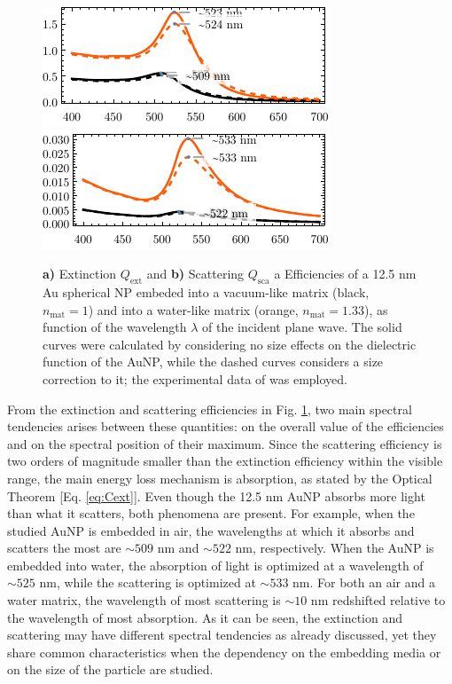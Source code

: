  \begin{figure}[h!]
 \includegraphics[scale=1.4]{1-Theory-Figs/Mie-Au/extinction-12--5nm-Au-in-H2O.pdf}
 \includegraphics[scale=1.4]{1-Theory-Figs/Mie-Au/scattering-12--5nm-Au-in-H2O.pdf}
\caption[Extinction and Scattering Corss Section of a 12.5 nm Au spherical NP embeded into a vacuum- and into a waterlike environment]{ \textbf{a)} Extinction $Q_\text{ext}$ and \textbf{b)} Scattering $Q_\text{sca}$ a Efficiencies of a 12.5 nm Au spherical NP embeded into a vacuum-like matrix (black, $n_\text{mat} = 1$)  and into a water-like matrix (orange, $n_\text{mat} = 1.33$), as function of  the wavelength $\lambda$ of the incident plane wave.  The solid curves were calculated by considering no size effects on the dielectric function of the AuNP, while the dashed curves considers a size correction to it; the experimental data of \citeauthor{johnson_optical_1972} \cite{johnson_optical_1972} was employed.} 
\label{fig:Mieefficiencies} 
 \end{figure}
 
From the extinction and scattering efficiencies in Fig. \ref{fig:Mieefficiencies}, two main spectral tendencies arises between these quantities: on the overall value of the efficiencies and on the spectral position of their maximum. Since the scattering efficiency is two orders of magnitude smaller than the extinction efficiency within the visible range, the main energy loss mechanism is absorption, as stated by the Optical Theorem [Eq. \eqref{eq:Cext}]. Even though the 12.5 nm AuNP absorbs more light than what it scatters, both phenomena are present. For example, when the  studied AuNP is embedded in air, the wavelengths at which it absorbs and scatters the most are $\sim 509$ nm and $\sim 522$ nm, respectively. When the AuNP is embedded into water, the absorption of light is optimized at a wavelength of $\sim 525$ nm, while the scattering is optimized at $\sim 533$ nm. For both an air and a water matrix, the wavelength of most scattering is $\sim 10$ nm redshifted relative to the wavelength of most absorption. As it can be seen, the extinction and scattering may have different spectral tendencies as already discussed, yet they share common characteristics   when the dependency on the embedding media or on the size of the particle are studied.

